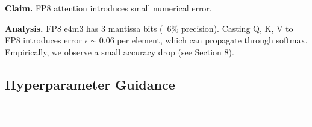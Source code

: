 \textbf{Claim.} FP8 attention introduces small numerical error.

\textbf{Analysis.} FP8 e4m3 has 3 mantissa bits (~6\% precision). Casting Q, K, V 
to FP8 introduces error $\epsilon \sim 0.06$ per element, which can propagate 
through softmax. Empirically, we observe a small accuracy drop (see Section 8).

\subsection{Hyperparameter Guidance}

\begin{lstlisting}

---
\end{lstlisting}